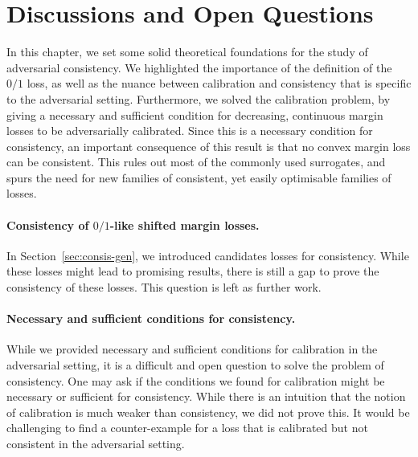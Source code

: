 \section{Discussions and Open Questions}
In this chapter, we set some solid theoretical foundations for the study of adversarial consistency. We highlighted the importance of the definition of the $0/1$ loss, as well as the nuance between calibration and consistency that is specific to the adversarial setting. Furthermore, we solved the calibration problem, by giving a necessary and sufficient condition for decreasing, continuous margin losses to be adversarially calibrated. Since this is a necessary condition for consistency, an important consequence of this result is that no convex margin loss can be consistent. This rules out most of the commonly used surrogates, and spurs the need for new families of consistent, yet easily optimisable families of losses.

\paragraph*{Consistency of $0/1$-like shifted margin losses.} In Section~\ref{sec:consis-gen}, we introduced candidates losses for consistency. While these losses might lead to promising results, there is still a gap to prove the consistency of these losses. This question is left as further work.



\paragraph*{Necessary and sufficient conditions for consistency.} While we provided necessary and sufficient conditions for calibration in the adversarial setting, it is a difficult and open question to solve the problem of consistency. One may ask if the conditions we found for calibration might be necessary or sufficient for consistency. While there is an intuition that the notion of calibration is much weaker than consistency, we did not prove this. It would be challenging to find a counter-example for a loss that is calibrated but not consistent in the adversarial setting.
